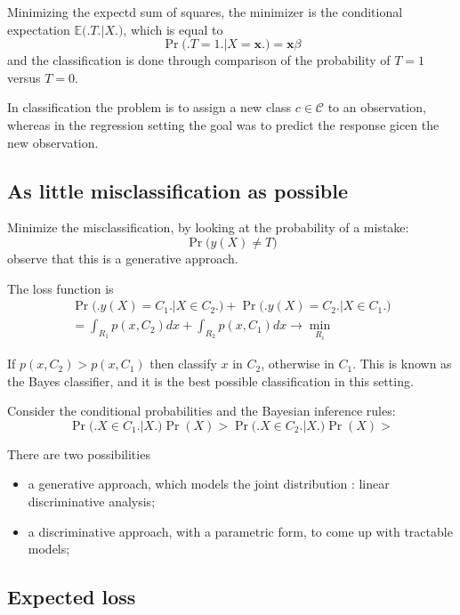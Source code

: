 \documentclass[a4paper]{article}
\newcommand{\Ccal}{\mathcal{C}}
\newcommand{\ex}{\mathbb{E}}
\begin{document}
Minimizing the expectd sum of squares, the minimizer is the conditional expectation $\ex\big(\big. T\big.\big\rvert X\big.\big)$, which is equal to 
\[\Pr\big(\big. T = 1\big.\big\rvert X = \mathbf{x}\big.\big) = \mathbf{x}\beta\]
and the classification is done through comparison of the probability of $T=1$ versus $T=0$.

In classification the problem is to assign a new class $c\in \Ccal$ to an observation, whereas in the regression setting the goal was to predict the response gicen the new observation.

\subsection{As little misclassification as possible} %
\label{sub:as_little_misclassification_as_possible}

Minimize the misclassification, by looking at the probability of a mistake:
\[\Pr\big(y(X)\neq T\big)\]
observe that this is a generative approach.

The loss function is
\begin{multline*}
	\Pr\big(\big. y(X) = C_1\big.\big\rvert X\in C_2\big.\big) + \Pr\big(\big. y(X) = C_2\big.\big\rvert X\in C_1\big.\big)\\
	= \int_{R_1} p(x, C_2) dx + \int_{R_2} p(x, C_1) dx \to \min_{R_i}
\end{multline*}

If $p(x, C_2) > p(x, C_1)$ then classify $x$ in $C_2$, otherwise in $C_1$.
This is known as the Bayes classifier, and it is the best possible classification in this setting.

Consider the conditional probabilities and the Bayesian inference rules:
\[\Pr\big(\big. X\in C_1\big.\big\rvert X\big.\big) \Pr( X ) > \Pr\big(\big. X\in C_2\big.\big\rvert X\big.\big) \Pr( X ) > \]

There are two possibilities \begin{itemize}
	\item a generative approach, which models the joint distribution : linear discriminative analysis;
	\item a discriminative approach, with a parametric form, to come up with tractable models;
\end{itemize}


\subsection{Expected loss} %
\label{sub:expected_loss}
\end{document}
